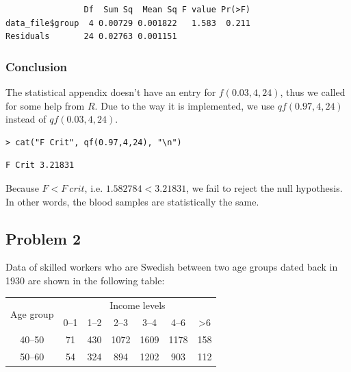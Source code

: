 \documentclass[a4paper]{article}
\numberwithin{equation}{section}
\begin{document}
\begin{mdframed}[leftline=false,rightline=false,backgroundcolor=teal!10,nobreak=true]
  \begin{verbatim}
                Df  Sum Sq  Mean Sq F value Pr(>F)
data_file$group  4 0.00729 0.001822   1.583  0.211
Residuals       24 0.02763 0.001151
  \end{verbatim}
\end{mdframed}

\subsubsection{Conclusion}
The statistical appendix doesn't have an entry for \(f(0.03, 4, 24)\), thus we called for some help from \(R\).
Due to the way it is implemented, we use \(qf(0.97, 4, 24)\) instead of \(qf(0.03, 4, 24)\).
\begin{mdframed}[leftline=false,rightline=false,backgroundcolor=teal!10,nobreak=true]
  \begin{verbatim}
> cat("F Crit", qf(0.97,4,24), "\n")
  \end{verbatim}
  \begin{verbatim}
F Crit 3.21831
  \end{verbatim}
\end{mdframed}

Because \(F < F\ crit\), i.e. \(1.582784 < 3.21831\), we fail to reject the null hypothesis.
In other words, the blood samples are statistically the same.

\newpage
\subsection{Problem 2}\label{p2}
Data of skilled workers who are Swedish between two age groups dated back in 1930 are shown in the following table:

\begin{center}
  \begin{tabular}{ccccccc}
    \toprule
    \multirow{2}{*}{Age group} & \multicolumn{6}{c}{Income levels}                                   \\
    \cmidrule(lr){2-7}
                               & 0--1                              & 1--2 & 2--3 & 3--4 & 4--6 & >6  \\
    \midrule
    40--50                     & 71                                & 430  & 1072 & 1609 & 1178 & 158 \\
    50--60                     & 54                                & 324  & 894  & 1202 & 903  & 112 \\
    \bottomrule
  \end{tabular}
\end{center}
\end{document}
